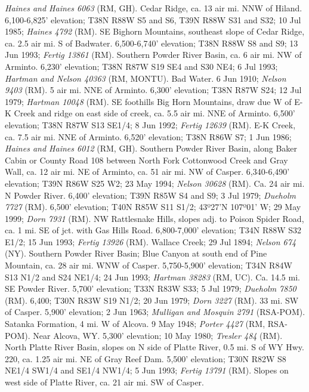 \textit{Haines and Haines 6063} (RM, GH).
Cedar Ridge, ca. 13 air mi. NNW of Hiland. 6,100-6,825’ elevation;
T38N R88W S5 and S6, T39N R88W S31 and S32; 10 Jul 1985;
\textit{Haines 4792} (RM).
SE Bighorn Mountains, southeast slope of Cedar Ridge, ca. 2.5 air mi. S of
Badwater. 6,500-6,740’ elevation; T38N R88W S8 and S9; 13 Jun 1993;
\textit{Fertig 13861} (RM).
Southern Powder River Basin, ca. 6 air mi. NW of Arminto. 6,230’ elevation;
T38N R87W S19 SE4 and S30 NE4; 6 Jul 1993;
\textit{Hartman and Nelson 40363} (RM, MONTU).
Bad Water. 6 Jun 1910; \textit{Nelson 9403} (RM).
5 air mi. NNE of Arminto. 6,300’ elevation; T38N R87W S24; 12 Jul 1979;
\textit{Hartman 10048} (RM).
SE foothills Big Horn Mountains, draw due W of E-K Creek and ridge on east side
of creek, ca. 5.5 air mi. NNE of Arminto. 6,500’ elevation; T38N R87W S13 SE1/4;
8 Jun 1992; \textit{Fertig 12639} (RM).
E-K Creek, ca. 7.5 air mi. NNE of Arminto. 6,520’ elevation; T38N R86W S7;
1 Jun 1986; \textit{Haines and Haines 6012} (RM, GH).
Southern Powder River Basin, along Baker Cabin or County Road 108 between North
Fork Cottonwood Creek and Gray Wall, ca. 12 air mi. NE of Arminto, ca. 51 air
mi. NW of Casper. 6,340-6,490’ elevation; T39N R86W S25 W2; 23 May 1994;
\textit{Nelson 30628} (RM).
Ca. 24 air mi. N Powder River. 6,400’ elevation; T39N R85W S4 and S9;
3 Jul 1979; \textit{Dueholm 7727} (RM).
6,500' elevation; T40N R85W S11 S1/2; 43º27'N 107º01' W; 29 May 1999;
\textit{Dorn 7931} (RM).
NW Rattlesnake Hills, slopes adj. to Poison Spider Road, ca. 1 mi. SE of jct.
with Gas Hills Road. 6,800-7,000’ elevation; T34N R88W S32 E1/2; 15 Jun 1993;
\textit{Fertig 13926} (RM).
Wallace Creek; 29 Jul 1894; \textit{Nelson 674} (NY).
Southern Powder River Basin; Blue Canyon at south end of Pine Mountain, ca. 28
air mi. WNW of Casper.	5,750-5,900' elevation; T34N R84W S13	N1/2 and
S24 NE1/4; 24 Jun 1993; \textit{Hartman 38283} (RM, UC).
Ca. 14.5 mi. SE Powder River. 5,700’ elevation; T33N R83W S33; 5 Jul 1979;
\textit{Dueholm 7850} (RM).
6,400; T30N R83W S19 N1/2; 20 Jun 1979; \textit{Dorn 3227} (RM).
33 mi. SW of Casper. 5,900’ elevation; 2 Jun 1963;
\textit{Mulligan and Mosquin 2791} (RSA-POM).
Satanka Formation, 4 mi. W of Alcova. 9 May 1948;
\textit{Porter 4427} (RM, RSA-POM).
Near Alcova, WY.  5,300’ elevation; 10 May 1980; \textit{Tresler 484} (RM).
North Platte River Basin, slopes on N side of Platte River, 0.5 mi. S of WY Hwy.
220, ca. 1.25 air mi. NE of Gray Reef Dam. 5,500’ elevation;
T30N R82W S8 NE1/4 SW1/4 and SE1/4 NW1/4; 5 Jun 1993;
\textit{Fertig 13791} (RM).
Slopes on west side of Platte River, ca. 21 air mi. SW of Casper.
